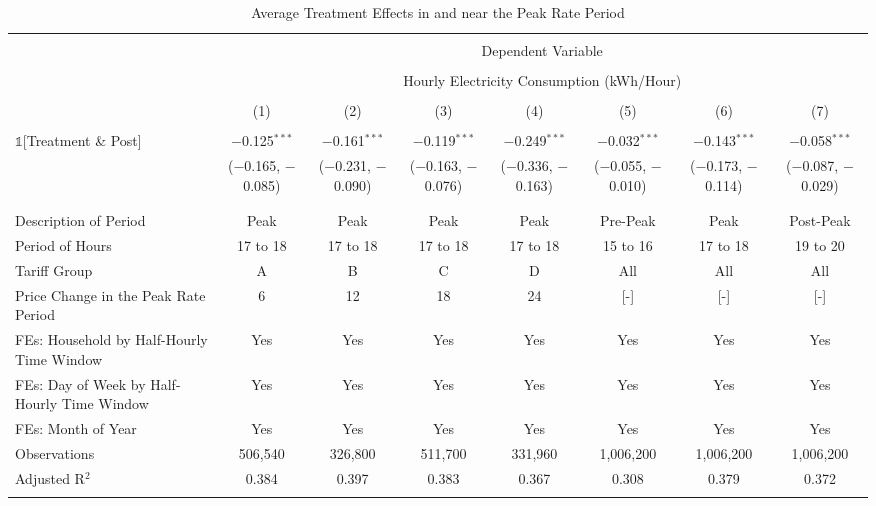 
\begin{table}[!htbp] \centering 
  \caption{Average Treatment Effects in and near the Peak Rate Period} 
  \label{Table:Average-Treatment-Effects-in-and-near-the-Peak-Rate-Period} 
\small 
\begin{tabular}{@{\extracolsep{1pt}}lccccccc} 
\\[-1.8ex]\hline 
\hline \\[-1.8ex] 
 & \multicolumn{7}{c}{Dependent Variable} \\ 
\cline{2-8} 
\\[-1.8ex] & \multicolumn{7}{c}{Hourly Electricity Consumption  (kWh/Hour)} \\ 
\\[-1.8ex] & (1) & (2) & (3) & (4) & (5) & (6) & (7)\\ 
\hline \\[-1.8ex] 
 $\mathbb{1}$[Treatment \& Post] & $-$0.125$^{***}$ & $-$0.161$^{***}$ & $-$0.119$^{***}$ & $-$0.249$^{***}$ & $-$0.032$^{***}$ & $-$0.143$^{***}$ & $-$0.058$^{***}$ \\ 
  & ($-$0.165, $-$0.085) & ($-$0.231, $-$0.090) & ($-$0.163, $-$0.076) & ($-$0.336, $-$0.163) & ($-$0.055, $-$0.010) & ($-$0.173, $-$0.114) & ($-$0.087, $-$0.029) \\ 
  & & & & & & & \\ 
\hline \\[-1.8ex] 
Description of Period & Peak & Peak & Peak & Peak & Pre-Peak & Peak & Post-Peak \\ 
Period of Hours & 17 to 18 & 17 to 18 & 17 to 18 & 17 to 18 & 15 to 16 & 17 to 18 & 19 to 20 \\ 
Tariff Group & A & B & C & D & All & All & All \\ 
Price Change in the Peak Rate Period & 6 & 12 & 18 & 24 & [-] & [-] & [-] \\ 
FEs: Household by Half-Hourly Time Window & Yes & Yes & Yes & Yes & Yes & Yes & Yes \\ 
FEs: Day of Week by Half-Hourly Time Window & Yes & Yes & Yes & Yes & Yes & Yes & Yes \\ 
FEs: Month of Year & Yes & Yes & Yes & Yes & Yes & Yes & Yes \\ 
Observations & 506,540 & 326,800 & 511,700 & 331,960 & 1,006,200 & 1,006,200 & 1,006,200 \\ 
Adjusted R$^{2}$ & 0.384 & 0.397 & 0.383 & 0.367 & 0.308 & 0.379 & 0.372 \\ 
\hline 
\hline \\[-1.8ex] 
\end{tabular} 
\end{table} 
